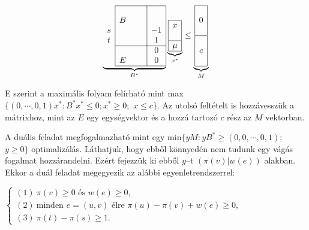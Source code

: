 \vspace{0.4cm}
\begin{wrapfigure}{L}{0.35\textwidth}
\begin{center}
\vspace{-1.3cm}
\begin{displaymath}
\underbrace{
\begin{array}{c|ccc|c|}
\cline{2-5}
&   & & & \\
&  B& & & \\
s &   & & &-1 \\
t &   & & & 1 \\
\cline{2-5}
&   & & & 0 \\
& E & & & 0 \\
\cline{2-5}
\end{array}}_{B^*}
\underbrace{
\begin{array}{|c|}
\hline
x\\
\\
\hline
\mu\\
\hline
\end{array}}_{x^*}
\leq
\underbrace{
\begin{array}{|c|}
\hline
\\
0\\
\\
\hline
\\
c\\
\\
\hline
\end{array}}_{M}
\end{displaymath}
\vspace{-1.3cm}
\end{center}
\end{wrapfigure}
E szerint a maximális folyam felírható mint max$\{ (0, \cdots,0,1)x^* : B^*x^* \leq
0; x^* \geq 0;$ $x \leq c \}$. Az utolsó feltételt is hozzávesszük a mátrixhoz,
mint az $E$ egy egységvektor és a hozzá tartozó $c$ rész az $M$ vektorban.

A duális feladat megfogalmazható mint egy min$\{ yM :yB^* \geq (0, 0, \cdots, 0,
1);$ $y \geq 0 \}$ optimalizálás. Láthatjuk, hogy ebből könnyedén nem tudunk egy
vágás fogalmat hozzárandelni. Ezért fejezzük ki ebből $y$--t $\left(
\pi\left(v\right) | w\left(e\right)\right)$ alakban. Ekkor a duál feladat
megegyezik az alábbi egyenletrendszerrel:

$\begin{cases}
(1)~\pi(v) \geq 0 \mbox{ és } w(e) \geq 0, \\
(2)~\mbox{minden } e = (u,v) \mbox{ élre }  \pi(u)-\pi(v)+w(e) \geq 0, \\
(3)~\pi(t)-\pi(s) \geq 1. \end{cases}$

